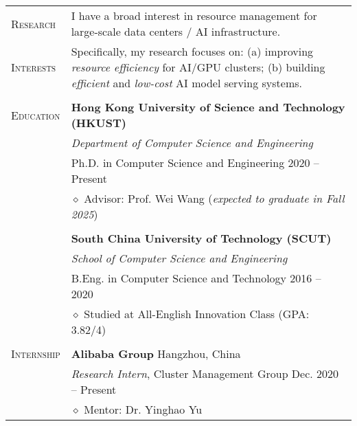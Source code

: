 \documentclass[letterpaper, 10pt]{article}
\begin{document}
\begin{longtable}{p{0.7in}p{6.0in}}


\textsc{Research}
& I have a broad interest in resource management for large-scale data centers / AI infrastructure. \\
\textsc{Interests}
& Specifically, my research focuses on: (a) improving \textit{resource efficiency} for AI/GPU clusters; (b) building \textit{efficient} and \textit{low-cost} AI model serving systems. \\
& \\

{\textsc{Education}}
& \textbf{Hong Kong University of Science and Technology (HKUST)} \\
& \textit{Department of Computer Science and Engineering} \\
& Ph.D. in Computer Science and Engineering \hfill 2020 -- Present \\
& $\diamond$ Advisor: Prof. Wei Wang \hfill (\textit{expected to graduate in Fall 2025}) \\
& \\

& \textbf{South China University of Technology (SCUT)} \\
& \textit{School of Computer Science and Engineering} \\
& B.Eng. in Computer Science and Technology \hfill 2016 -- 2020 \\
& $\diamond$ Studied at All-English Innovation Class (GPA: 3.82/4) \\
& \\


\nohyphens{\textsc{Internship}}
& {\textbf{Alibaba Group}} \hfill Hangzhou, China \\
& \textit{Research Intern}, Cluster Management Group \hfill Dec. 2020 -- Present \\
& $\diamond$ Mentor: Dr. Yinghao Yu \\


\end{longtable}
\end{document}
